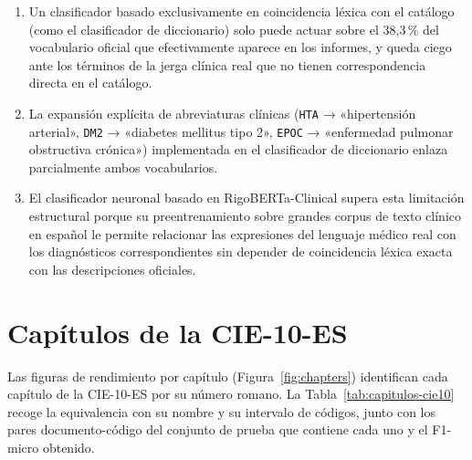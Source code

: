 \begin{enumerate}
 \item Un clasificador basado exclusivamente en coincidencia léxica con el catálogo (como el clasificador de diccionario) solo puede actuar sobre el 38,3\,\% del vocabulario oficial que efectivamente aparece en los informes, y queda ciego ante los términos de la jerga clínica real que no tienen correspondencia directa en el catálogo.
 \item La expansión explícita de abreviaturas clínicas (\texttt{HTA} → «hipertensión arterial», \texttt{DM2} → «diabetes mellitus tipo 2», \texttt{EPOC} → «enfermedad pulmonar obstructiva crónica») implementada en el clasificador de diccionario enlaza parcialmente ambos vocabularios.
 \item El clasificador neuronal basado en RigoBERTa-Clinical supera esta limitación estructural porque su preentrenamiento sobre grandes corpus de texto clínico en español le permite relacionar las expresiones del lenguaje médico real con los diagnósticos correspondientes sin depender de coincidencia léxica exacta con las descripciones oficiales.
\end{enumerate}

\section{Capítulos de la CIE-10-ES}
\label{sec:capitulos-cie10}

Las figuras de rendimiento por capítulo (Figura~\ref{fig:chapters}) identifican cada capítulo de la CIE-10-ES por su número romano. La Tabla~\ref{tab:capitulos-cie10} recoge la equivalencia con su nombre y su intervalo de códigos, junto con los pares documento-código del conjunto de prueba que contiene cada uno y el F1-micro obtenido.


